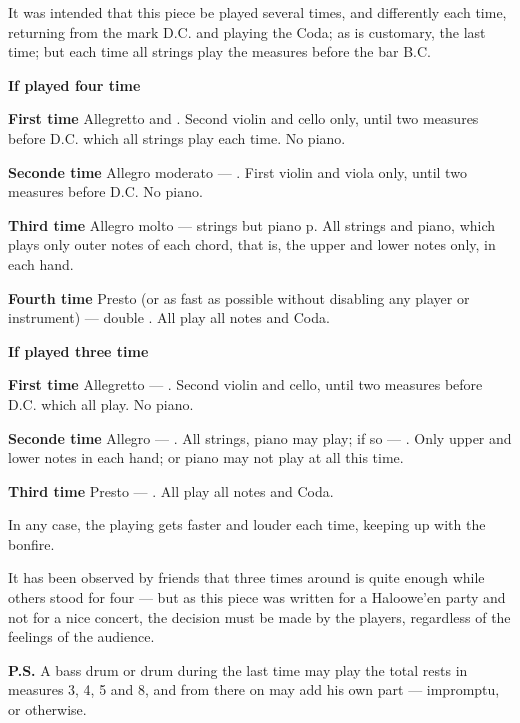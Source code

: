 \newpage

It was intended that this piece be played several times, and differently each time, returning from the mark D.C. and playing the Coda; as is customary, the last time; but each time all strings play the measures before the bar B.C.

\begin{center}
\textbf{If played four time}
\end{center}

\textbf{First time} Allegretto and . Second violin and cello only, until two measures before D.C. which all strings play each time. No piano.

\textbf{Seconde time} Allegro moderato --- . First violin and viola only, until two measures before D.C. No piano.

\textbf{Third time} Allegro molto --- strings  but piano {p}. All strings and piano, which plays only outer notes of each chord, that is, the upper and lower notes only, in each hand.

\textbf{Fourth time} Presto (or as fast as possible without disabling any player or instrument) --- double . All play all notes and Coda.



\begin{center}
\textbf{If played three time}
\end{center}

\textbf{First time} Allegretto --- . Second violin and cello, until two measures before D.C. which all play. No piano.

\textbf{Seconde time} Allegro --- . All strings, piano may play; if so --- . Only upper and lower notes in each hand; or piano may not play at all this time.

\textbf{Third time} Presto --- . All play all notes and Coda.

In any case, the playing gets faster and louder each time, keeping up with the bonfire.

It has been observed by friends that three times around is quite enough while others stood for four --- but as this piece was written for a Haloowe'en party and not for a nice concert, the decision must be made by the players, regardless of the feelings of the audience.

\textbf{P.S.} A bass drum or drum during the last time may play the total rests in measures 3, 4, 5 and 8, and from there on may add his own part --- impromptu, or otherwise.




